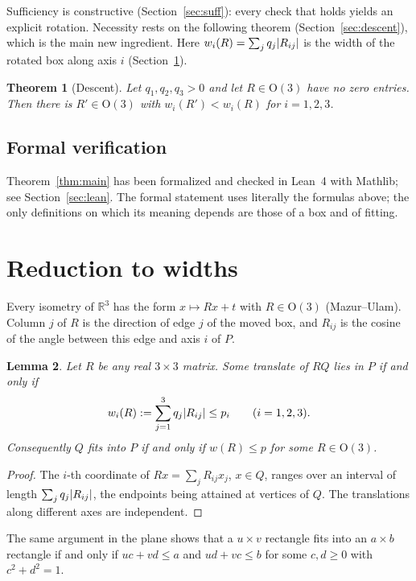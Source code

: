 \documentclass[11pt]{article}
\newtheorem{theorem}{Theorem}[section]
\newtheorem{lemma}[theorem]{Lemma}
\theoremstyle{definition}
\theoremstyle{remark}
\newcommand{\R}{\mathbb{R}}
\newcommand{\Ort}{\mathrm{O}(3)}
\DeclarePairedDelimiter{\abs}{\lvert}{\rvert}
\begin{document}
Sufficiency is constructive (Section~\ref{sec:suff}): every check that holds yields an explicit
rotation. Necessity rests on the following theorem (Section~\ref{sec:descent}), which is the main new
ingredient. Here $w_i(R)=\sum_j q_j\abs{R_{ij}}$ is the width of the rotated box along axis $i$
(Section~\ref{sec:widths}).

\begin{theorem}[Descent]\label{thm:Z}
Let $q_1,q_2,q_3>0$ and let $R\in\Ort$ have no zero entries. Then there is $R'\in\Ort$ with
$w_i(R')<w_i(R)$ for $i=1,2,3$.
\end{theorem}

\subsection*{Formal verification}
Theorem~\ref{thm:main} has been formalized and checked in Lean~4 with Mathlib; see
Section~\ref{sec:lean}. The formal statement uses literally the formulas above; the only definitions
on which its meaning depends are those of a box and of fitting.

\section{Reduction to widths}\label{sec:widths}

Every isometry of $\R^3$ has the form $x\mapsto Rx+t$ with $R\in\Ort$ (Mazur--Ulam). Column $j$ of $R$
is the direction of edge $j$ of the moved box, and $R_{ij}$ is the cosine of the angle between this
edge and axis $i$ of $P$.

\begin{lemma}\label{lem:widths}
Let $R$ be any real $3\times3$ matrix. Some translate of $RQ$ lies in $P$ if and only if
\[
w_i(R):=\sum_{j=1}^3 q_j\abs{R_{ij}}\le p_i\qquad(i=1,2,3).
\]
Consequently $Q$ fits into $P$ if and only if $w(R)\le p$ for some $R\in\Ort$.
\end{lemma}

\begin{proof}
The $i$-th coordinate of $Rx=\sum_j R_{ij}x_j$, $x\in Q$, ranges over an interval of length
$\sum_j q_j\abs{R_{ij}}$, the endpoints being attained at vertices of $Q$. The translations along
different axes are independent.
\end{proof}

The same argument in the plane shows that a $u\times v$ rectangle fits into an $a\times b$ rectangle
if and only if $uc+vd\le a$ and $ud+vc\le b$ for some $c,d\ge0$ with $c^2+d^2=1$.
\end{document}
